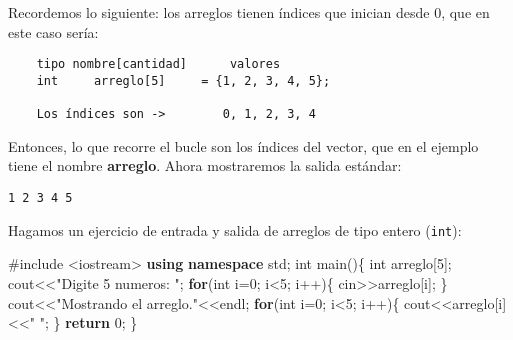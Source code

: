 \documentclass[
  11pt,
  a4paper,
  DIV=11,
  numbers=noendperiod]{scrreprt}
\newenvironment{Shaded}{\begin{snugshade}}{\end{snugshade}}
\newcommand{\ControlFlowTok}[1]{\textcolor[rgb]{0.00,0.23,0.31}{\textbf{#1}}}
\newcommand{\DataTypeTok}[1]{\textcolor[rgb]{0.68,0.00,0.00}{#1}}
\newcommand{\DecValTok}[1]{\textcolor[rgb]{0.68,0.00,0.00}{#1}}
\newcommand{\ImportTok}[1]{\textcolor[rgb]{0.00,0.46,0.62}{#1}}
\newcommand{\KeywordTok}[1]{\textcolor[rgb]{0.00,0.23,0.31}{\textbf{#1}}}
\newcommand{\NormalTok}[1]{\textcolor[rgb]{0.00,0.23,0.31}{#1}}
\newcommand{\OperatorTok}[1]{\textcolor[rgb]{0.37,0.37,0.37}{#1}}
\newcommand{\PreprocessorTok}[1]{\textcolor[rgb]{0.68,0.00,0.00}{#1}}
\newcommand{\StringTok}[1]{\textcolor[rgb]{0.13,0.47,0.30}{#1}}
\begin{document}
Recordemos lo siguiente: los arreglos tienen índices que inician desde
0, que en este caso sería:

\begin{tcolorbox}[custombox]
\begin{verbatim}
    tipo nombre[cantidad]      valores 
    int     arreglo[5]     = {1, 2, 3, 4, 5};
              
    Los índices son ->        0, 1, 2, 3, 4
\end{verbatim}
\end{tcolorbox}

Entonces, lo que recorre el bucle son los índices del vector, que en el
ejemplo tiene el nombre \textbf{arreglo}. Ahora mostraremos la salida
estándar:

\begin{tcolorbox}[custombox]
\begin{verbatim}
1 2 3 4 5
\end{verbatim}
\end{tcolorbox}

Hagamos un ejercicio de entrada y salida de arreglos de tipo entero
(\texttt{int}):

\begin{Shaded}
\begin{Highlighting}[]
\PreprocessorTok{\#include }\ImportTok{\textless{}iostream\textgreater{}}
\KeywordTok{using} \KeywordTok{namespace}\NormalTok{ std}\OperatorTok{;}
\DataTypeTok{int}\NormalTok{ main}\OperatorTok{()\{}
    \DataTypeTok{int}\NormalTok{ arreglo}\OperatorTok{[}\DecValTok{5}\OperatorTok{];}
\NormalTok{    cout}\OperatorTok{\textless{}\textless{}}\StringTok{"Digite 5 numeros: "}\OperatorTok{;}
    \ControlFlowTok{for}\OperatorTok{(}\DataTypeTok{int}\NormalTok{ i}\OperatorTok{=}\DecValTok{0}\OperatorTok{;}\NormalTok{ i}\OperatorTok{\textless{}}\DecValTok{5}\OperatorTok{;}\NormalTok{ i}\OperatorTok{++)\{}
\NormalTok{        cin}\OperatorTok{\textgreater{}\textgreater{}}\NormalTok{arreglo}\OperatorTok{[}\NormalTok{i}\OperatorTok{];}
    \OperatorTok{\}}
\NormalTok{    cout}\OperatorTok{\textless{}\textless{}}\StringTok{"Mostrando el arreglo."}\OperatorTok{\textless{}\textless{}}\NormalTok{endl}\OperatorTok{;}
    \ControlFlowTok{for}\OperatorTok{(}\DataTypeTok{int}\NormalTok{ i}\OperatorTok{=}\DecValTok{0}\OperatorTok{;}\NormalTok{ i}\OperatorTok{\textless{}}\DecValTok{5}\OperatorTok{;}\NormalTok{ i}\OperatorTok{++)\{}
\NormalTok{        cout}\OperatorTok{\textless{}\textless{}}\NormalTok{arreglo}\OperatorTok{[}\NormalTok{i}\OperatorTok{]\textless{}\textless{}}\StringTok{" "}\OperatorTok{;}
    \OperatorTok{\}}
    \ControlFlowTok{return} \DecValTok{0}\OperatorTok{;}
\OperatorTok{\}}
\end{Highlighting}
\end{Shaded}
\end{document}
